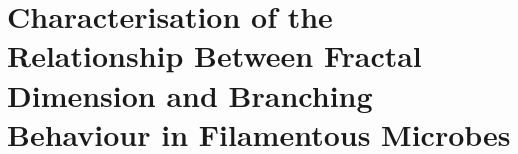 \chapter{Characterisation of the Relationship Between Fractal Dimension and Branching Behaviour in Filamentous Microbes}





